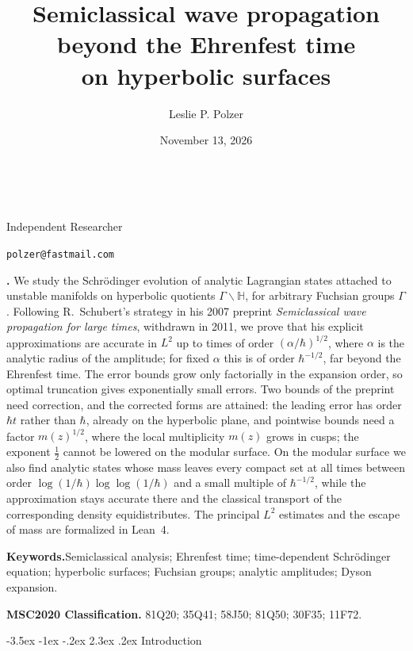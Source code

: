 \documentclass[twoside,10pt]{article}
\title{Semiclassical wave propagation beyond the Ehrenfest time\\
on hyperbolic surfaces}
\author{Leslie P. Polzer}
\date{November 13, 2026}
\makeatletter
\numberwithin{equation}{section}
\theoremstyle{slbody}
\theoremstyle{remark}
\newcommand{\Hb}{\mathbb{H}}
\newcommand{\authoraffiliation}{Independent Researcher}
\newcommand{\authoremail}{polzer@fastmail.com}
\renewcommand{\section}{%
  \@startsection{section}{1}{\z@}%
    {-3.5ex \@plus -1ex \@minus -.2ex}%
    {2.3ex \@plus .2ex}%
    {\normalfont\large\bfseries}}
\renewcommand{\maketitle}{%
  \begin{center}
    {\large\bfseries\@title}\\
    \vskip36pt
    \ifx\@author\@empty
      \mbox{}\par
    \else
      {\scshape\@author}\par
      \medskip
      {\small\authoraffiliation}\par
      \smallskip
      {\small\texttt{\authoremail}}\par
      \smallskip
      {\small\@date}\par
    \fi
    \vskip36pt
  \end{center}}
\renewenvironment{abstract}
  {\quotation\noindent\small{\bfseries\abstractname.\enspace}}
  {\endquotation}
\makeatother
\begin{document}
\maketitle

\begin{abstract}
We study the Schr\"odinger evolution of analytic Lagrangian states attached to unstable manifolds on hyperbolic
quotients $\Gamma\backslash\Hb$, for arbitrary Fuchsian groups $\Gamma$. Following R.~Schubert's strategy in his 2007 preprint
\emph{Semiclassical wave propagation for large times}, withdrawn in 2011, we prove that his explicit approximations are
accurate in $L^2$ up to times of order $(\alpha/\hbar)^{1/2}$, where $\alpha$ is the analytic radius of the amplitude; for
fixed $\alpha$ this is of order $\hbar^{-1/2}$, far beyond the Ehrenfest time. The error bounds grow only factorially in the
expansion order, so optimal truncation gives exponentially small errors. Two bounds of the preprint need correction, and the
corrected forms are attained: the leading error has order $\hbar t$ rather than $\hbar$, already on the hyperbolic plane, and
pointwise bounds need a factor $m(z)^{1/2}$, where the local multiplicity $m(z)$ grows in cusps; the exponent $\tfrac12$ cannot be
lowered on the modular surface. On the modular surface we also find analytic states whose mass leaves every compact set at all times between
order $\log(1/\hbar)\log\log(1/\hbar)$ and a small multiple of $\hbar^{-1/2}$, while the approximation stays accurate there and the
classical transport of the corresponding density equidistributes. The principal $L^2$ estimates and the escape of mass are formalized in Lean~4.

\vskip5pt
\noindent\textbf{Keywords.}\enspace Semiclassical analysis; Ehrenfest time; time-dependent
Schr\"odinger equation; hyperbolic surfaces; Fuchsian groups; analytic
amplitudes; Dyson expansion.

\vskip5pt
\noindent\textbf{MSC2020 Classification.}\enspace
81Q20; 35Q41; 58J50; 81Q50; 30F35; 11F72.
\end{abstract}

\clearpage
\setcounter{tocdepth}{2}
\tableofcontents
\medskip

\vskip50pt
\baselineskip=13.5pt
\section{Introduction}\label{sec:intro}
\end{document}
